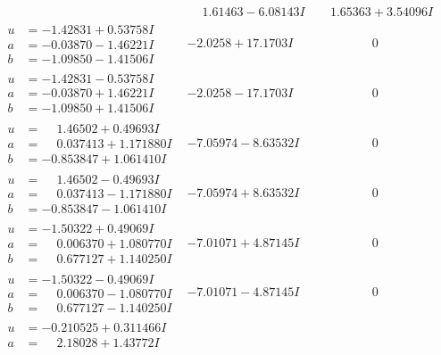 \documentclass[1p]{elsarticle_modified}
\theoremstyle{definition}
\begin{document}
$$\begin{array}{c|c|c}
 & \phantom{-}1.61463 - 6.08143 I & \phantom{-}1.65363 + 3.54096 I \\ \hline\begin{aligned}
u &= -1.42831 + 0.53758 I \\
a &= -0.03870 - 1.46221 I \\
b &= -1.09850 - 1.41506 I\end{aligned}
 & -2.0258 + 17.1703 I & \phantom{-0.000000 } 0 \\ \hline\begin{aligned}
u &= -1.42831 - 0.53758 I \\
a &= -0.03870 + 1.46221 I \\
b &= -1.09850 + 1.41506 I\end{aligned}
 & -2.0258 - 17.1703 I & \phantom{-0.000000 } 0 \\ \hline\begin{aligned}
u &= \phantom{-}1.46502 + 0.49693 I \\
a &= \phantom{-}0.037413 + 1.171880 I \\
b &= -0.853847 + 1.061410 I\end{aligned}
 & -7.05974 - 8.63532 I & \phantom{-0.000000 } 0 \\ \hline\begin{aligned}
u &= \phantom{-}1.46502 - 0.49693 I \\
a &= \phantom{-}0.037413 - 1.171880 I \\
b &= -0.853847 - 1.061410 I\end{aligned}
 & -7.05974 + 8.63532 I & \phantom{-0.000000 } 0 \\ \hline\begin{aligned}
u &= -1.50322 + 0.49069 I \\
a &= \phantom{-}0.006370 + 1.080770 I \\
b &= \phantom{-}0.677127 + 1.140250 I\end{aligned}
 & -7.01071 + 4.87145 I & \phantom{-0.000000 } 0 \\ \hline\begin{aligned}
u &= -1.50322 - 0.49069 I \\
a &= \phantom{-}0.006370 - 1.080770 I \\
b &= \phantom{-}0.677127 - 1.140250 I\end{aligned}
 & -7.01071 - 4.87145 I & \phantom{-0.000000 } 0 \\ \hline\begin{aligned}
u &= -0.210525 + 0.311466 I \\
a &= \phantom{-}2.18028 + 1.43772 I \\

\end{aligned}
\end{array}$$
\end{document}
